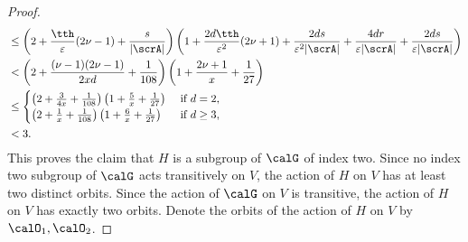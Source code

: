 \begin{proof}
\begin{align*}
& 
\leq 
\left(2 + \frac{\tth}{\varepsilon} (2\nu -1) + \frac{s}{|\scrA|} \right) \left( 1 + \frac{2d\tth}{\varepsilon^2}(2\nu+ 1) + \frac{2ds}{\varepsilon^2|\scrA|} + \frac{4dr}{\varepsilon |\scrA|} + \frac{2ds}{\varepsilon |\scrA|}  \right)\\
& 
< 
\left(2 + \frac{(\nu-1)(2\nu -1)}{2xd} +\frac{1}{108} \right) \left( 1 + \frac{2\nu+ 1}{x}+ \frac 1{27}\right)\\
& 
\leq 
\begin{cases}
\left(2 + \frac 3{4x}+ \frac{1}{108}\right) \left( 1 + \frac{5}{x}+ \frac 1{27}\right) & \text{ if } d = 2, \\
\left(2 + \frac 1{x} + \frac{1}{108}\right) \left( 1 + \frac{6}{x}+ \frac 1{27}\right) & \text{ if } d \geq 3,
\end{cases}\\
& 
< 3.
\end{align*}
This proves the claim that $H$ is a subgroup of $\calG$ of index two. Since no index two subgroup of $\calG$ acts transitively on $V$, the action of $H$ on $V$ has at least two distinct orbits. Since the action of $\calG$ on $V$ is transitive, the action of $H$ on $V$ has exactly two orbits. Denote the orbits of the action of $H$ on $V$ by $\calO_1, \calO_2$.  


\end{proof}
